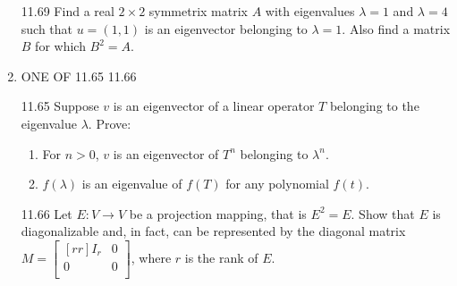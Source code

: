\documentclass[12pt]{article}
\theoremstyle{definition}
\theoremstyle{plain}
\begin{document}
\begin{enumerate}
\begin{enumerate}
	\end{enumerate}
\item[11.69]Find a real $2 \times 2$ symmetrix matrix $A$ with eigenvalues $\lambda = 1$ and $\lambda = 4$ such that $u=(1,1)$ is an eigenvector belonging to $\lambda=1$. Also find a matrix $B$ for which $B^2=A$.
\item ONE OF 11.65 11.66
\item[11.65]Suppose $v$ is an eigenvector of a linear operator $T$ belonging to the eigenvalue $\lambda$. Prove:
	\begin{enumerate}
	\item For $n>0$, $v$ is an eigenvector of $T^n$ belonging to $\lambda^n$.
	\item $f(\lambda)$ is an eigenvalue of $f(T)$ for any polynomial $f(t)$.
	\end{enumerate}
\item[11.66]Let $E:V\rightarrow V$ be a projection mapping, that is $E^2=E$. Show that $E$ is diagonalizable and, in fact, can be represented by the diagonal matrix $M=\begin{bmatrix}[rr]I_r&0\\0&0\\\end{bmatrix}$, where $r$ is the rank of $E$.
	
\end{enumerate}	
\end{document}
